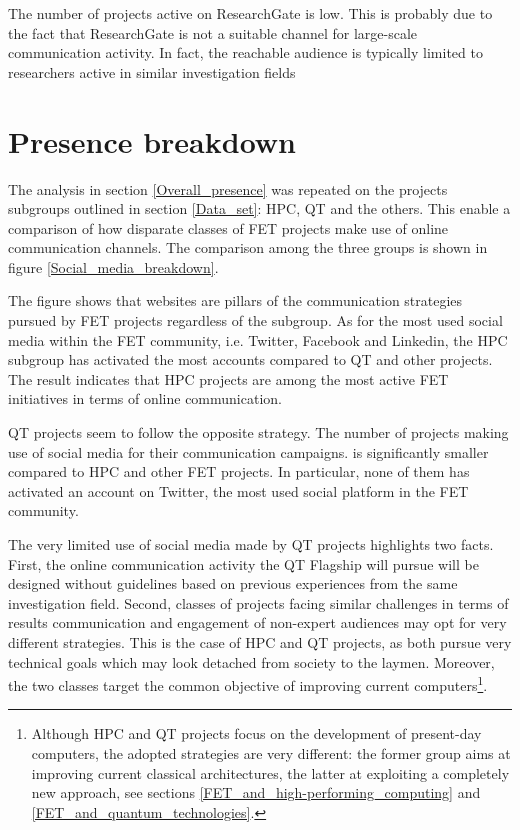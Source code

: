 The number of projects active on ResearchGate is low. This is probably due to the fact that ResearchGate is not a suitable channel for large-scale communication activity. In fact, the reachable audience is typically limited to researchers active in similar investigation fields

\section{Presence breakdown}
The analysis in section \ref{Overall_presence} was repeated on the projects subgroups outlined in section \ref{Data_set}: HPC, QT and the others. This enable a comparison of how disparate classes of FET projects make use of online communication channels. The comparison among the three groups is shown in figure \ref{Social_media_breakdown}. 

The figure shows that websites are pillars of the communication strategies pursued by FET projects regardless of the subgroup. As for the most used social media within the FET community, i.e. Twitter, Facebook and Linkedin, the HPC subgroup has activated the most accounts compared to QT and other projects. The result indicates that HPC projects are among the most active FET initiatives in terms of online communication.  

QT projects seem to follow the opposite strategy. The number of projects making use of social media for their communication campaigns. is significantly smaller compared to HPC and other FET projects. In particular, none of them has activated an account on Twitter, the most used social platform in the FET community. 

The very limited use of social media made by QT projects highlights two facts. First, the online communication activity the QT Flagship will pursue will be designed without guidelines based on previous experiences from the same investigation field. Second, classes of projects facing similar challenges in terms of results communication and engagement of non-expert audiences may opt for very different strategies. This is the case of HPC and QT projects, as both pursue very technical goals which may look detached from society to the laymen. Moreover, the two classes target the common objective of improving current computers\footnote{Although HPC and QT projects focus on the development of present-day computers, the adopted strategies are very different: the former group aims at improving current classical architectures, the latter at exploiting a completely new approach, see sections \ref{FET_and_high-performing_computing} and \ref{FET_and_quantum_technologies}.}.

